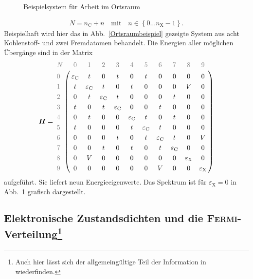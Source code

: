 \documentclass[a4paper, 10pt, twoside, openany]{book} %
\newcommand \braces[1]{\left \lbrace #1 \right \rbrace}
\def \vec {\boldsymbol}
\def \eC {\varepsilon_\mathrm{C}}
\def \eX {\varepsilon_\mathrm{X}}
\def \nC {n_\mathrm{C}}
\begin{document}
\begin{figure}
\begin{minipage}[b]{0.48\textwidth}
			\label{Ortsraumbeispiel DOS}
		\end{minipage}
		\caption{Beispielsystem für Arbeit im Ortsraum}
	\end{figure}
	\begin{align*}
		N = \nC + n \quad \text{mit} \quad n \in \braces{0 \dots n_\text{X} - 1}.
	\end{align*}
	Beispielhaft wird hier das in Abb.~\ref{Ortsraumbeispiel} gezeigte System aus acht Kohlenstoff- und zwei Fremdatomen behandelt. Die Energien aller möglichen Übergänge sind in der Matrix
	\begin{align*}
		\vec H = \bordermatrix{
		    \color{grey} N & \color{grey} 0 & \color{grey} 1 & \color{grey} 2 & \color{grey} 3 & \color{grey} 4 & \color{grey} 5 & \color{grey} 6 & \color{grey} 7 & \color{grey} 8 & \color{grey} 9 \cr
			\color{grey} 0 & \eC & t   & 0   & t   & 0   & t   & 0   & 0   & 0   & 0 \cr
			\color{grey} 1 & t   & \eC & t   & 0   & t   & 0   & 0   & 0   & V   & 0 \cr
			\color{grey} 2 & 0   & t   & \eC & t   & 0   & 0   & 0   & t   & 0   & 0 \cr
			\color{grey} 3 & t   & 0   & t   & \eC & 0   & 0   & t   & 0   & 0   & 0 \cr
			\color{grey} 4 & 0   & t   & 0   & 0   & \eC & t   & 0   & t   & 0   & 0 \cr
			\color{grey} 5 & t   & 0   & 0   & 0   & t   & \eC & t   & 0   & 0   & 0 \cr
			\color{grey} 6 & 0   & 0   & 0   & t   & 0   & t   & \eC & t   & 0   & V \cr
			\color{grey} 7 & 0   & 0   & t   & 0   & t   & 0   & t   & \eC & 0   & 0 \cr
			\color{grey} 8 & 0   & V   & 0   & 0   & 0   & 0   & 0   & 0   & \eX & 0 \cr
			\color{grey} 9 & 0   & 0   & 0   & 0   & 0   & 0   & V   & 0   & 0   & \eX }
	\end{align*}
	aufgeführt. Sie liefert neun Energieeigenwerte. Das Spektrum ist für $\eX = 0$ in Abb.~\ref{Ortsraumbeispiel DOS} grafisch dargestellt.
	
	\subsection[Elektronische Zustandsdichten und die \textsc{Fermi}-Verteilung]{Elektronische Zustandsdichten und die \textsc{Fermi}-Verteilung\footnote{Auch hier lässt sich der allgemeingültige Teil der Information in \cite[S.~132f]{Czycholl} wiederfinden.}}
	\label{Zustandsdichte}
	
\end{document}
